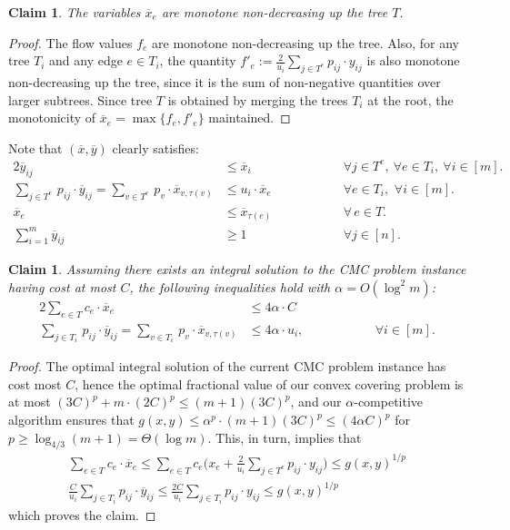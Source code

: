 \documentclass[letterpaper,11pt]{article}
\newtheorem{claim}[thm]{Claim}
\newcommand{\ox}{\ensuremath{\overline{x}}\xspace}
\newcommand{\oy}{\ensuremath{\overline{y}}\xspace}
\def\oy{\overline{y}}
\def\ox{\overline{x}}
\begin{document}
\begin{claim}
  The variables $\ox_e$ are monotone non-decreasing up the tree $T$.
\end{claim}
\begin{proof}
  The flow values $f_e$ are monotone non-decreasing up the tree. Also,
  for any tree $T_i$ and any edge $e \in T_i$, the quantity $f'_e :=
  \frac{2}{u_i}\sum_{j\in T^e} p_{ij} \cdot y_{ij}$ is also monotone
  non-decreasing up the tree, since it is the sum of non-negative
  quantities over larger subtrees. Since tree $T$ is obtained by merging
  the trees $T_i$ at the root, the monotonicity of
  $\ox_e=\max\{f_e,f'_e\}$ maintained.
\end{proof}

Note that $(\ox,\oy)$ clearly satisfies:
\begin{alignat}{2}
  \oy_{ij} &\leq \ox_i & \qquad\qquad
  & \forall j\in T^e, ~ \forall
  e\in T_i, ~ \forall i\in [m].
  \label{eq:cmp:0} \\
  \sum_{j\in T^e}\, p_{ij}\cdot \oy_{ij}  = \sum_{v\in
    T^e}\, p_{v}\cdot \ox_{v,\tau(v)}  &\le  u_i \cdot \ox_e
  & & \forall e\in T_i,\,\, \forall i\in [m].
  \label{eq:cmp:1} \\
  \ox_e &\le \ox_{\tau(e)} & & \forall \, e \in T.
  \label{eq:cmp:2} \\
  \sum_{i=1}^m \oy_{ij} &\ge 1 && \forall j\in [n].
  \label{eq:cmp:3}
\end{alignat}

\begin{claim}
  \label{cl:cmp-LB}
  Assuming there exists an integral solution to the CMC problem instance
  having cost at most $C$, the following inequalities hold with
  $\alpha=O(\log^2m)$:
  \begin{alignat}{2}
    \sum_{e\in T} c_e\cdot \ox_e &\le  4\alpha \cdot C
    && \label{eq:cmp:4} \\
    \sum_{j\in T_i}\, p_{ij}\cdot \oy_{ij} = \sum_{v\in
      T_i}\, p_{v}\cdot \ox_{v,\tau(v)} &\le 4\alpha \cdot
    u_i, & \qquad\qquad &\forall i\in[m]. \label{eq:cmp:5}
  \end{alignat}
\end{claim}

\begin{proof}
  The optimal integral solution of the current CMC problem instance has
  cost most $C$, hence the optimal fractional value of our convex
  covering problem is at most $(3C)^p+ m\cdot (2C)^p\le (m+1)(3C)^p$, and
  our $\alpha$-competitive algorithm ensures that $g(x,y)\le
  \alpha^p\cdot (m+1)(3C)^p \leq (4\alpha C)^p$ for $p \geq \log_{4/3}
  (m+1) = \Theta(\log m)$. This, in turn, implies that
  \begin{gather}
    \sum_{e\in T} c_e\cdot \ox_e \le \sum_{e\in T} c_e \bigg(x_e +
      \frac{2}{u_i}\sum_{j\in T^e} p_{ij} \cdot y_{ij} \bigg) \le
    g(x,y)^{1/p} \\
    \frac{C}{u_i}\sum_{j\in T_i} p_{ij} \cdot \oy_{ij} \le \frac{2C}{u_i}
    \sum_{j\in T_i} p_{ij} \cdot y_{ij} \le g(x,y)^{1/p}
  \end{gather}
  which proves the claim.
\end{proof}
\end{document}
